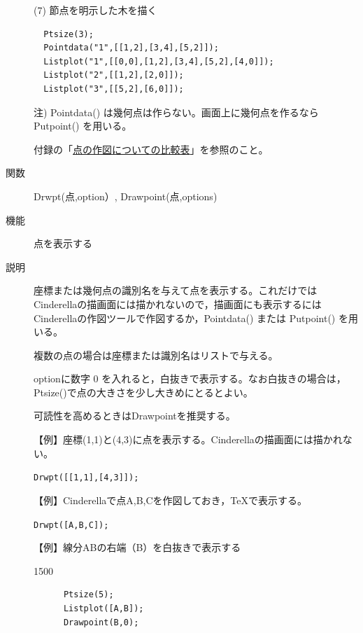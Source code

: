 \documentclass[papersize,a4paper,12pt,uplatex]{jsarticle}
\begin{document}
\begin{description}
(7) 節点を明示した木を描く
\begin{verbatim}
  Ptsize(3); 
  Pointdata("1",[[1,2],[3,4],[5,2]]); 
  Listplot("1",[[0,0],[1,2],[3,4],[5,2],[4,0]]); 
  Listplot("2",[[1,2],[2,0]]); 
  Listplot("3",[[5,2],[6,0]]);
\end{verbatim}
 
 \begin{center}  \end{center}

注) Pointdata() は幾何点は作らない。画面上に幾何点を作るなら Putpoint() を用いる。

付録の「\hyperlink{mkpttable}{点の作図についての比較表}」を参照のこと。


\vspace{\baselineskip}
\hypertarget{drwpt}{}
\item[関数]  Drwpt(点,option）, Drawpoint(点,options)
\item[機能]  点を表示する
\item[説明]  座標または幾何点の識別名を与えて点を表示する。これだけではCinderellaの描画面には描かれないので，描画面にも表示するにはCinderellaの作図ツールで作図するか，Pointdata() または Putpoint() を用いる。

複数の点の場合は座標または識別名はリストで与える。

optionに数字 0 を入れると，白抜きで表示する。なお白抜きの場合は，Ptsize()で点の大きさを少し大きめにとるとよい。

可読性を高めるときはDrawpointを推奨する。

\vspace{\baselineskip}
【例】座標(1,1)と(4,3)に点を表示する。Cinderellaの描画面には描かれない。

\hspace{10mm} \verb|Drwpt([[1,1],[4,3]]);|

\vspace{\baselineskip}
【例】Cinderellaで点A,B,Cを作図しておき，\TeX で表示する。

\hspace{10mm} \verb|Drwpt([A,B,C]); |

\vspace{\baselineskip}
【例】線分ABの右端（B）を白抜きで表示する

\begin{layer}{150}{0}
\end{layer}
\begin{verbatim}
      Ptsize(5);
      Listplot([A,B]);
      Drawpoint(B,0);
\end{verbatim}


\end{description}
\end{document}

